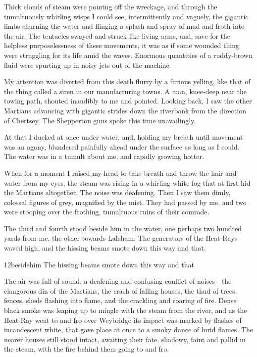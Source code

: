 Thick clouds of steam were pouring off the wreckage, and through the tumultuously whirling wisps I could see, intermittently and vaguely, the gigantic limbs churning the water and flinging a splash and spray of mud and froth into the air. The tentacles swayed and struck like living arms, and, save for the helpless purposelessness of these movements, it was as if some wounded thing were struggling for its life amid the waves. Enormous quantities of a ruddy-brown fluid were spurting up in noisy jets out of the machine.

My attention was diverted from this death flurry by a furious yelling, like that of the thing called a siren in our manufacturing towns. A man, knee-deep near the towing path, shouted inaudibly to me and pointed. Looking back, I saw the other Martians advancing with gigantic strides down the riverbank from the direction of Chertsey. The Shepperton guns spoke this time unavailingly.

At that I ducked at once under water, and, holding my breath until movement was an agony, blundered painfully ahead under the surface as long as I could. The water was in a tumult about me, and rapidly growing hotter.

When for a moment I raised my head to take breath and throw the hair and water from my eyes, the steam was rising in a whirling white fog that at first hid the Martians altogether. The noise was deafening. Then I saw them dimly, colossal figures of grey, magnified by the mist. They had passed by me, and two were stooping over the frothing, tumultuous ruins of their comrade.

The third and fourth stood beside him in the water, one perhaps two hundred yards from me, the other towards Laleham. The generators of the Heat-Rays waved high, and the hissing beams smote down this way and that.



\begin{bwbigpic}
	[1.2] 
	{12besidehim} 
	{The hissing beams smote down this way and that} 
\end{bwbigpic}

The air was full of sound, a deafening and confusing conflict of noises—the clangorous din of the Martians, the crash of falling houses, the thud of trees, fences, sheds flashing into flame, and the crackling and roaring of fire. Dense black smoke was leaping up to mingle with the steam from the river, and as the Heat-Ray went to and fro over Weybridge its impact was marked by flashes of incandescent white, that gave place at once to a smoky dance of lurid flames. The nearer houses still stood intact, awaiting their fate, shadowy, faint and pallid in the steam, with the fire behind them going to and fro.

